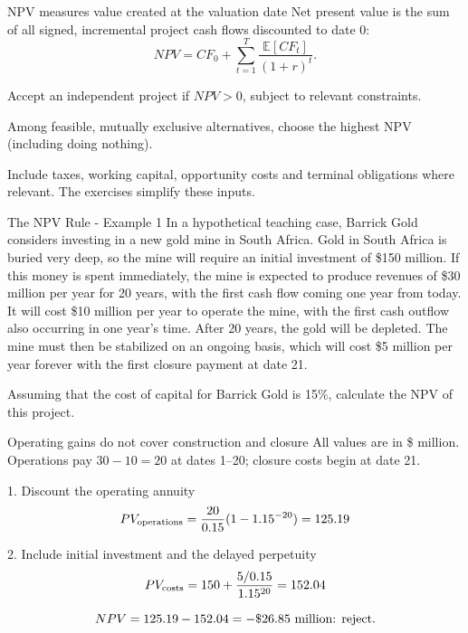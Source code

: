 \documentclass[9pt,aspectratio=169]{beamer}
\newenvironment{wideitemize}{\itemize\addtolength{\itemsep}{10pt}}{\enditemize}
\begin{document}
\begin{frame}{NPV measures value created at the valuation date}
Net present value is the sum of all signed, incremental project cash flows discounted to date 0:
\[
NPV=CF_0+\sum_{t=1}^{T}\frac{\mathbb{E}[CF_t]}{(1+r)^t}.
\]
\begin{wideitemize}
\item Accept an independent project if $NPV>0$, subject to relevant constraints.
\item Among feasible, mutually exclusive alternatives, choose the highest NPV (including doing nothing).
\item Include taxes, working capital, opportunity costs and terminal obligations where relevant. The exercises simplify these inputs.
\end{wideitemize}
\end{frame}

\begin{frame}{The NPV Rule - Example 1}
In a hypothetical teaching case, Barrick Gold considers investing in a new gold mine in South Africa. Gold in South Africa is buried very deep, so the mine will require an initial investment of \$150 million. If this money is spent immediately, the mine is expected to produce revenues of \$30 million per year for 20 years, with the first cash flow coming one year from today. It will cost \$10 million per year to operate the mine, with the first cash outflow also occurring in one year's time. After 20 years, the gold will be depleted. The mine must then be stabilized on an ongoing basis, which will cost \$5 million per year forever \alert{with the first closure payment at date 21}.

Assuming that the cost of capital for Barrick Gold is 15\%, calculate the NPV of this project.
\end{frame}

\begin{frame}{Operating gains do not cover construction and closure}
All values are in \$ million. Operations pay $30-10=20$ at dates 1--20; closure costs begin at date 21.
\begin{block}{1. Discount the operating annuity}
\[PV_{\mathrm{operations}}=\frac{20}{0.15}(1-1.15^{-20})=125.19\]
\end{block}
\begin{block}{2. Include initial investment and the delayed perpetuity}
\[PV_{\mathrm{costs}}=150+\frac{5/0.15}{1.15^{20}}=152.04\]
\end{block}
\[NPV=125.19-152.04=-\$26.85\text{ million: reject.}\]
\end{frame}
\end{document}
